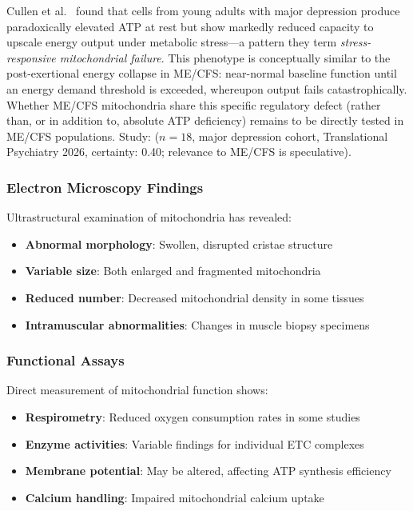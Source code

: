 \begin{speculation}
\label{spec:cullen2026-atp-fatigue}
Cullen et al.~\cite{Cullen2026ATP} found that cells from young adults with major depression produce paradoxically elevated ATP at rest but show markedly reduced capacity to upscale energy output under metabolic stress---a pattern they term \textit{stress-responsive mitochondrial failure}. This phenotype is conceptually similar to the post-exertional energy collapse in ME/CFS: near-normal baseline function until an energy demand threshold is exceeded, whereupon output fails catastrophically. Whether ME/CFS mitochondria share this specific regulatory defect (rather than, or in addition to, absolute ATP deficiency) remains to be directly tested in ME/CFS populations.
Study: ($n=18$, major depression cohort, Translational Psychiatry 2026, certainty: 0.40; relevance to ME/CFS is speculative).
\end{speculation}

\subsubsection{Electron Microscopy Findings}

Ultrastructural examination of mitochondria has revealed:

\begin{itemize}
    \item \textbf{Abnormal morphology}: Swollen, disrupted cristae structure
    \item \textbf{Variable size}: Both enlarged and fragmented mitochondria
    \item \textbf{Reduced number}: Decreased mitochondrial density in some tissues
    \item \textbf{Intramuscular abnormalities}: Changes in muscle biopsy specimens
\end{itemize}

\subsubsection{Functional Assays}

Direct measurement of mitochondrial function shows:

\begin{itemize}
    \item \textbf{Respirometry}: Reduced oxygen consumption rates in some studies
    \item \textbf{Enzyme activities}: Variable findings for individual ETC complexes
    \item \textbf{Membrane potential}: May be altered, affecting ATP synthesis efficiency
    \item \textbf{Calcium handling}: Impaired mitochondrial calcium uptake
\end{itemize}

